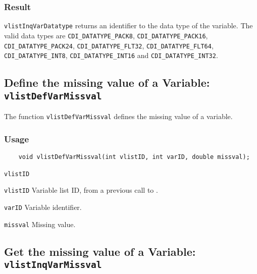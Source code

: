 \subsubsection*{Result}

{\texttt{vlistInqVarDatatype}} returns an identifier to the data type of the variable.
The valid {\CDI} data types are {\texttt{CDI\_DATATYPE\_PACK8}}, {\texttt{CDI\_DATATYPE\_PACK16}}, {\texttt{CDI\_DATATYPE\_PACK24}},
{\texttt{CDI\_DATATYPE\_FLT32}}, {\texttt{CDI\_DATATYPE\_FLT64}}, {\texttt{CDI\_DATATYPE\_INT8}}, {\texttt{CDI\_DATATYPE\_INT16}} and
{\texttt{CDI\_DATATYPE\_INT32}}.



\subsection{Define the missing value of a Variable: \texttt{vlistDefVarMissval}}
\label{vlistDefVarMissval}

The function {\texttt{vlistDefVarMissval}} defines the missing value of a variable.

\subsubsection*{Usage}

\begin{verbatim}
    void vlistDefVarMissval(int vlistID, int varID, double missval);
\end{verbatim}

\hspace*{4mm}\begin{minipage}[]{15cm}
\begin{deflist}{\texttt{vlistID}\ }
\item[\texttt{vlistID}]
Variable list ID, from a previous call to {}.
\item[\texttt{varID}]
Variable identifier.
\item[\texttt{missval}]
Missing value.

\end{deflist}
\end{minipage}


\subsection{Get the missing value of a Variable: \texttt{vlistInqVarMissval}}
\label{vlistInqVarMissval}

